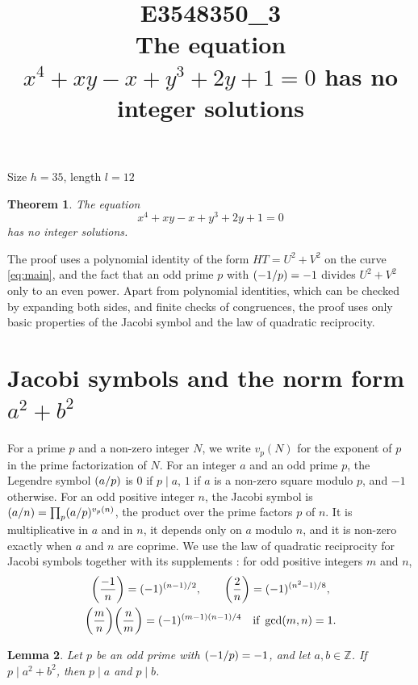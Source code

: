 \documentclass[11pt]{article}
\title{\textbf{E3548350\_3}\\[4pt] {\Large The equation $x^{4}+xy-x+y^{3}+2y+1=0$ has no integer solutions}}
\author{}
\date{}
\newtheorem{theorem}{Theorem}
\newtheorem{lemma}[theorem]{Lemma}
\newcommand{\Z}{\mathbb{Z}}
\newcommand{\leg}[2]{\mathchoice{\biggl(\dfrac{#1}{#2}\biggr)}{(#1/#2)}{(#1/#2)}{(#1/#2)}}
\begin{document}
\maketitle
\vspace{-8ex}
\begin{center}
Size $h=35$, length $l=12$
\end{center}

\begin{theorem}\label{thm:main}
The equation
\begin{equation}\label{eq:main}
x^{4}+xy-x+y^{3}+2y+1=0
\end{equation}
has no integer solutions.
\end{theorem}

The proof uses a polynomial identity of the form $HT=U^2+V^2$ on the curve \eqref{eq:main}, and the fact that an odd prime $p$ with $\leg{-1}{p}=-1$ divides $U^2+V^2$ only to an even power. Apart from polynomial identities, which can be checked by expanding both sides, and finite checks of congruences, the proof uses only basic properties of the Jacobi symbol and the law of quadratic reciprocity.

\section{\texorpdfstring{Jacobi symbols and the norm form $a^2+b^2$}{Jacobi symbols and the norm form}}

For a prime $p$ and a non-zero integer $N$, we write $v_p(N)$ for the exponent of $p$ in the prime factorization of $N$. For an integer $a$ and an odd prime $p$, the Legendre symbol $\leg{a}{p}$ is $0$ if $p\mid a$, $1$ if $a$ is a non-zero square modulo $p$, and $-1$ otherwise. For an odd positive integer $n$, the Jacobi symbol is $\leg{a}{n}=\prod_p\leg{a}{p}^{v_p(n)}$, the product over the prime factors $p$ of $n$. It is multiplicative in $a$ and in $n$, it depends only on $a$ modulo $n$, and it is non-zero exactly when $a$ and $n$ are coprime. We use the law of quadratic reciprocity for Jacobi symbols together with its supplements \cite[Chapter~5, \S2]{IR}: for odd positive integers $m$ and $n$,
\begin{gather*}
\leg{-1}{n}=(-1)^{(n-1)/2},\qquad\leg{2}{n}=(-1)^{(n^2-1)/8},\\
\leg{m}{n}\leg{n}{m}=(-1)^{(m-1)(n-1)/4}\quad\text{if }\gcd(m,n)=1.
\end{gather*}

\begin{lemma}\label{lem:divides}
Let $p$ be an odd prime with $\leg{-1}{p}=-1$, and let $a,b\in\Z$. If $p\mid a^2+b^2$, then $p\mid a$ and $p\mid b$.
\end{lemma}
\end{document}
